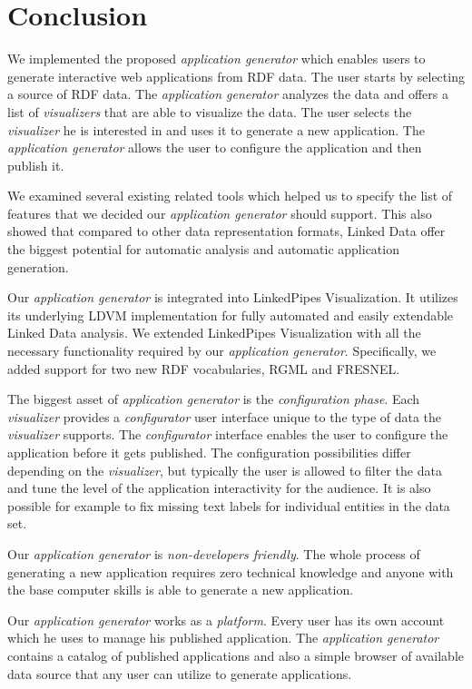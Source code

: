 \chapter*{Conclusion}

We implemented the proposed \emph{application generator} which enables users to generate interactive web applications from RDF data. The user starts by selecting a source of RDF data. The \emph{application generator} analyzes the data and offers a list of \emph{visualizers} that are able to visualize the data. The user selects the \emph{visualizer} he is interested in and uses it to generate a new application. The \emph{application generator} allows the user to configure the application and then publish it.

We examined several existing related tools which helped us to specify the list of features that we decided our \emph{application generator} should support. This also showed that compared to other data representation formats, Linked Data offer the biggest potential for automatic analysis and automatic application generation.

Our \emph{application generator} is integrated into LinkedPipes Visualization. It utilizes its underlying LDVM implementation for fully automated and easily extendable Linked Data analysis. We extended LinkedPipes Visualization with all the necessary functionality required by our \emph{application generator}. Specifically, we added support for two new RDF vocabularies, RGML and FRESNEL.

The biggest asset of \emph{application generator} is the \emph{configuration phase}. Each \emph{visualizer} provides a \emph{configurator} user interface unique to the type of data the \emph{visualizer} supports. The \emph{configurator} interface enables the user to configure the application before it gets published. The configuration possibilities differ depending on the \emph{visualizer}, but typically the user is allowed to filter the data and tune the level of the application interactivity for the audience. It is also possible for example to fix missing text labels for individual entities in the data set.

Our \emph{application generator} is \emph{non-developers friendly}. The whole process of generating a new application requires zero technical knowledge and anyone with the base computer skills is able to generate a new application.

Our \emph{application generator} works as a \emph{platform}. Every user has its own account which he uses to manage his published application. The \emph{application generator} contains a catalog of published applications and also a simple browser of available data source that any user can utilize to generate applications.

